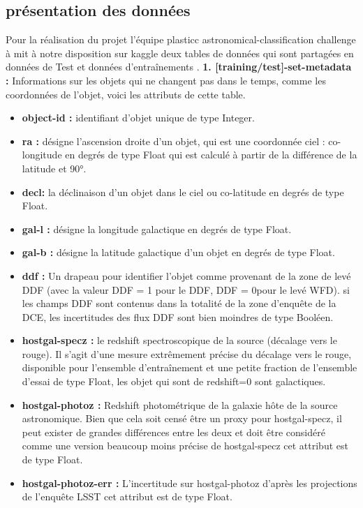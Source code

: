 \subsection{présentation des données}
Pour la réalisation du projet l’équipe  plasticc astronomical-classification challenge à mit à notre disposition sur kaggle deux tables de données qui sont partagées en données de Test et données d’entraînements .
\newline
\newline
\textbf{1. [training/test]-set-metadata :} Informations sur les objets qui ne changent pas dans le temps, comme les coordonnées de l’objet, voici les attributs de cette table.
\begin{itemize}
    \item \textbf{object-id :} identifiant d’objet unique de type Integer.
    \item \textbf{ra :} désigne l’ascension droite d’un objet, qui est une coordonnée ciel : co-longitude en degrés de type Float qui est calculé à partir de la différence de la latitude et 90°.
    \item \textbf{ decl:} la déclinaison d’un objet dans le ciel ou co-latitude en degrés de type Float.
    \item \textbf{ gal-l :} désigne la longitude galactique en degrés de type Float.
    \item \textbf{gal-b : }désigne la latitude galactique d’un objet en degrés de type Float.
    \item \textbf{ ddf :} Un drapeau pour identifier l’objet comme provenant de la zone de levé DDF (avec la valeur DDF = 1 pour le DDF, DDF = 0pour le levé WFD). si les champs DDF sont contenus dans la totalité de la zone d’enquête de la DCE, les incertitudes des flux DDF sont bien moindres de type Booléen.
    \item \textbf{ hostgal-specz : }le redshift spectroscopique de la source (décalage vers le rouge). Il s’agit d’une mesure extrêmement précise du décalage vers le rouge, disponible pour l’ensemble d’entraînement et une petite fraction de l’ensemble d’essai de type Float, les objet qui sont de redshift=0 sont galactiques.
    \item \textbf{hostgal-photoz :} Redshift photométrique de la galaxie hôte de la source astronomique. Bien que cela soit censé être un proxy pour hostgal-specz, il peut exister de grandes différences entre les deux et doit être considéré comme une version beaucoup moins précise de hostgal-specz cet attribut est de type Float.
    \item \textbf{hostgal-photoz-err :} L’incertitude sur hostgal-photoz d’après les projections de l’enquête LSST cet attribut est de type Float.

\end{itemize}
